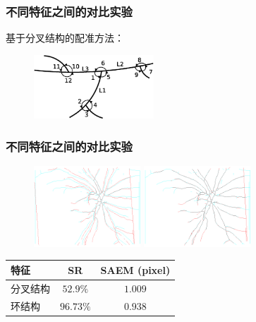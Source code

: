\documentclass[notheorems,mathserif,table,compress]{beamer}  %
\begin{document}
\begin{frame}
\frametitle{不同特征之间的对比实验}
基于分叉结构的配准方法：
\begin{figure}
  \centering
  \includegraphics[width=0.4\textwidth]{chap03/bifurcation-structure}
  \caption*{\color{blue}{分叉结构特征}}
\end{figure}
\end{frame}

\begin{frame}
\frametitle{不同特征之间的对比实验}
\begin{figure}
\begin{minipage}[b]{0.48\textwidth}
    \centering
    \includegraphics[width=4cm]{chap03/bifu2.png}
  \end{minipage}
\begin{minipage}[b]{0.48\textwidth}
    \centering
    \includegraphics[width=4cm]{chap03/ours2.png}
  \end{minipage}
\caption*{\color{blue}{分叉结构特征与环结构特征}}
\end{figure}

\begin{table}
\centering
\begin{tabular}{lcc}
\toprule
特征 & SR & SAEM (pixel)\\
\midrule
分叉结构 & $52.9\%$ & $1.009$\\
环结构 & $\mathbf{96.73\%}$ & $\mathbf{0.938}$\\
\bottomrule
\end{tabular}
\end{table}

\end{frame}
\end{document}

